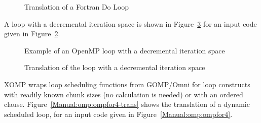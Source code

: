 \begin{figure}[htbp]
{\indent
  {\mySmallFontSize
    \begin{latexonly}
    
    \end{latexonly}
    \begin{htmlonly}
    
    \end{htmlonly}
  }
}
\caption{Translation of a Fortran Do Loop}
\label{Manual:omp:do-default-trans-f}
\end{figure}


A loop with a decremental iteration space is shown in 
Figure~\ref{Manual:omp:ompfor5-trans} for an input code given in
Figure~\ref{Manual:omp:ompfor5}. 

\lstset{language=C,basicstyle=\scriptsize}
\begin{figure}[htbp]
{\indent
  {\mySmallFontSize
    \begin{latexonly}
    
    \end{latexonly}
    \begin{htmlonly}
    
    \end{htmlonly}
  }
}
\caption{Example of an OpenMP loop with a decremental iteration space}
\label{Manual:omp:ompfor5}
\end{figure}

\begin{figure}[htbp]
{\indent
  {\mySmallFontSize
    \begin{latexonly}
    
    \end{latexonly}
    \begin{htmlonly}
    
    \end{htmlonly}
  }
}
\caption{Translation of the loop with a decremental iteration space}
\label{Manual:omp:ompfor5-trans}
\end{figure}

XOMP wraps loop scheduling functions from GOMP/Omni for loop constructs with readily
known chunk sizes (no calculation is needed) or with an ordered clause. 
Figure~\ref{Manual:omp:ompfor4-trans} shows the translation of a dynamic scheduled loop,  for an input code given in
Figure~\ref{Manual:omp:ompfor4}. 

